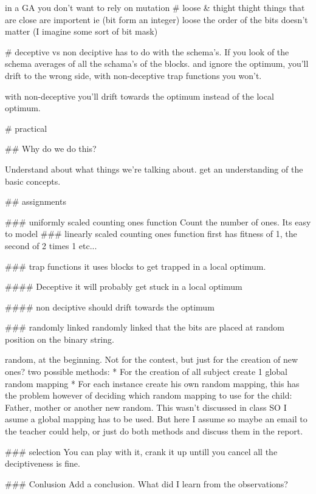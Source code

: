 in a GA you don't want to rely on mutation
# loose & thight
thight things that are close are importent ie (bit form an integer)
loose the order of the bits doesn't matter (I imagine some sort of bit mask)

# deceptive vs non deciptive
has to do with the schema's. If you look of the schema averages of all the
schama's of the blocks. and ignore the optimum, you'll drift to the wrong
side, with non-deceptive trap functions you won't.

with non-deceptive you'll drift towards the optimum instead of the local
optimum.

# practical

## Why do we do this?

Understand about what things we're talking about. get an understanding of
the basic concepts.

## assignments

### uniformly scaled counting ones function
Count the number of ones. Its easy to model
### linearly scaled counting ones function
first has fitness of 1, the second of 2 times 1 etc...

### trap functions
it uses blocks to get trapped in a local optimum.

#### Deceptive
it will probably get stuck in a local optimum

#### non deciptive
should drift towards the optimum

### randomly linked
randomly linked that the bits are placed at random position on the binary
string.

random, at the beginning. Not for the contest, but just for the creation of
new ones?
two possible methods:
	* For the creation of all subject create 1 global random mapping
	* For each instance create his own random mapping, this has the
	problem however of deciding which random mapping to use for the child:
		Father, mother or another new random.
This wasn't discussed in class SO I asume a global mapping has to be used.
But here I assume so maybe an email to the teacher could help, or just do
both methods and discuss them in the report.

### selection
You can play with it, crank it up untill you cancel all the deciptiveness is
fine.

### Conlusion
Add a conclusion. What did I learn from the observations?
